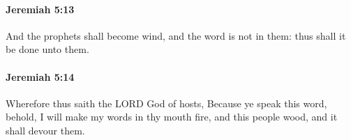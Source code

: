 		\paragraph{Jeremiah 5:13} %
			\label{JEREMIAH-5-13}

			And the prophets shall become wind, and the word is not in them: thus shall it be done unto them.


		\paragraph{Jeremiah 5:14} %
			\label{JEREMIAH-5-14}

			Wherefore thus saith the LORD God of hosts, Because ye speak this word, behold, I will make my words in thy mouth fire, and this people wood, and it shall devour them.


